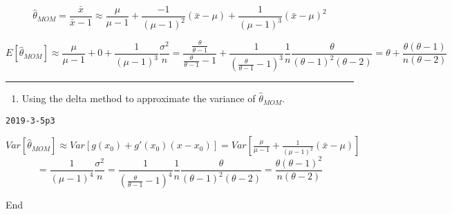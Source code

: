 \documentclass[12pt,]{article}
\newenvironment{Shaded}{\begin{snugshade}}{\end{snugshade}}
\newcommand{\NormalTok}[1]{#1}
\providecommand{\tightlist}{%
  \setlength{\itemsep}{0pt}\setlength{\parskip}{0pt}}
\begin{document}
\[\hat\theta_{MOM}=\frac{\bar x}{\bar x-1}\approx \frac{\mu}{\mu-1}+\frac{-1}{(\mu-1)^2}(\bar x-\mu)+\frac{1}{(\mu-1)^3}(\bar x-\mu)^2\]

\[E[\hat\theta_{MOM}]\approx \frac{\mu}{\mu-1}+0+\frac{1}{(\mu-1)^3}\frac{\sigma^2}n=\frac{\frac\theta{\theta-1}}{\frac\theta{\theta-1}-1}+\frac{1}{(\frac\theta{\theta-1}-1)^3}\frac1n\frac{\theta}{(\theta-1)^2(\theta-2)}=\theta+\frac{\theta(\theta-1)}{n(\theta-2)}\]

\begin{center}\rule{0.5\linewidth}{\linethickness}\end{center}

\begin{enumerate}
\def\labelenumi{\alph{enumi}.}
\setcounter{enumi}{2}
\tightlist
\item
  \textcolor[rgb]{0.5,0.5,0.5}{Using the delta method to approximate the variance of $\hat\theta_{MOM}$.}
\end{enumerate}

\texttt{2019-3-5p3}

\(Var[\hat\theta_{MOM}]\approx Var[g(x_0)+g'(x_0)(x-x_0)]=Var[\frac{\mu}{\mu-1}+\frac{1}{(\mu-1)^2}(\bar x-\mu)]\)
\[=\frac{1}{(\mu-1)^4}\frac{\sigma^2}n=\frac{1}{(\frac\theta{\theta-1}-1)^4}\frac1n\frac{\theta}{(\theta-1)^2(\theta-2)}=\frac{\theta(\theta-1)^2}{n(\theta-2)}\]

\begin{Shaded}
\begin{Highlighting}[]
\NormalTok{End}
\end{Highlighting}
\end{Shaded}
\end{document}
